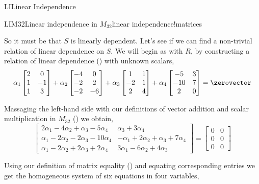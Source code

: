 \begin{subsect}{LI}{Linear Independence}
\begin{example}{LIM32}{Linear independence in $M_{32}$}{linear independence!matrices}
%
\begin{para}So it must be that $S$ is linearly dependent.  Let's see if we can find a non-trivial relation of linear dependence on $S$.  We will begin as with $R$, by constructing a relation of linear dependence () with unknown scalars,
%
\begin{equation*}
\alpha_1\begin{bmatrix}
2 & 0\\ 1 & -1\\ 1 & 3
\end{bmatrix}+
\alpha_2\begin{bmatrix}
-4 & 0\\ -2 & 2\\ -2 & -6
\end{bmatrix}+
\alpha_3\begin{bmatrix}
1 & 1\\ -2 & 1\\ 2 & 4
\end{bmatrix}+
\alpha_4\begin{bmatrix}
-5 & 3\\ -10 & 7\\ 2 & 0
\end{bmatrix}=
\zerovector
\end{equation*}
\end{para}
%
\begin{para}Massaging the left-hand side with our definitions of vector addition and scalar multiplication in $M_{32}$ () we obtain,
%
\begin{equation*}
\begin{bmatrix}
2\alpha_1-4\alpha_2+\alpha_3-5\alpha_4&
                              \alpha_3+3\alpha_4\\
\alpha_1-2\alpha_2-2\alpha_3-10\alpha_4&
-\alpha_1+2\alpha_2+\alpha_3+7\alpha_4\\
\alpha_1-2\alpha_2+2\alpha_3+2\alpha_4&
3\alpha_1-6\alpha_2+4\alpha_3
\end{bmatrix}
=\begin{bmatrix}
0&0\\0&0\\0&0
\end{bmatrix}
\end{equation*}
\end{para}
%
\begin{para}Using our definition of matrix equality () and equating corresponding entries we get the homogeneous system of six equations in four variables,

\end{para}
\end{example}
\end{subsect}
